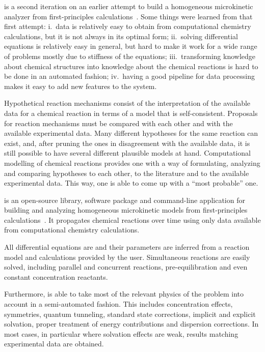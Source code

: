 \overreact is a second iteration on an earlier attempt to build a
homogeneous microkinetic analyzer from first-principles
calculations~\cite{pyrrole2019zenodo}.
Some things were learned from that first attempt:
i.\ data is relatively easy to obtain from computational chemistry calculations,
but it is not always in its optimal form;
ii.\ solving differential equations is relatively easy in general,
but hard to
make it work for a wide range of problems mostly due to stiffness of the
equations;
iii.\ transforming knowledge about chemical structures into knowledge about the
chemical reactions is hard to be done in an automated fashion;
iv.\ having a good pipeline for data processing makes it easy to add new
features to the system.

Hypothetical reaction mechanisms consist of
the interpretation of the available data for a chemical reaction
in terms of a model that is self-consistent.
Proposals for reaction mechanisms must be compared
with each other
and with the available experimental data.
Many different hypotheses for the same reaction can exist,
and,
after pruning the ones in disagreement with the available data,
it is still possible to have several different plausible models at hand.
Computational modelling of chemical reactions
provides one with a way of
formulating,
analyzing and
comparing hypotheses to each other,
to the literature and to the available experimental data.
This way,
one is able to come up with a ``most probable'' one.

\overreact is an open-source library,
software package and command-line
application for building and analyzing
homogeneous microkinetic models from first-principles
calculations~\cite{Schneider_2022,overreact2021zenodo}.
It propagates chemical reactions over time using only data available from
computational chemistry calculations.

All differential equations are and their parameters are inferred from a
reaction model and calculations provided by the user.
Simultaneous reactions are easily solved,
including parallel and concurrent
reactions,
pre-equilibration and even constant concentration reactants.

Furthermore,
\overreact is able to take most of the relevant physics of the problem into
account in a semi-automated fashion.
This includes concentration effects,
symmetries,
quantum
tunneling,
standard state corrections,
implicit and explicit solvation,
proper treatment
of energy contributions and dispersion corrections.
In most cases,
in particular where solvation effects are weak,
results matching
experimental data are obtained.

